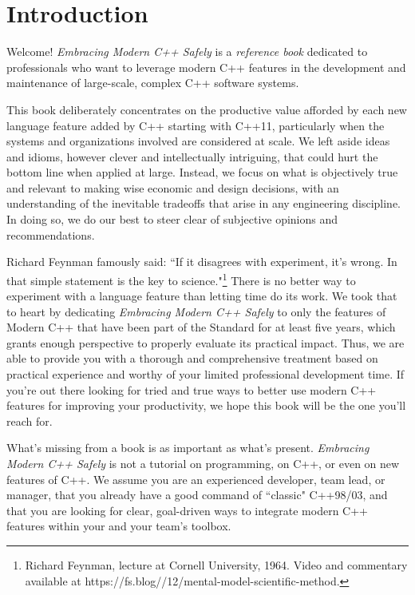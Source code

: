 \setcounter{chapter}{-1}
\chapter[Introduction]{Introduction}\label{ch-intro}

Welcome! \textit{Embracing Modern C++ Safely} is a \textit{reference book} dedicated to professionals who want to leverage modern C++ features in the development and maintenance of large-scale, complex C++ software systems.

This book deliberately concentrates on the productive value afforded by each new language feature added by C++ starting with C++11, particularly when the systems and organizations involved are considered at scale. We left aside ideas and idioms, however clever and intellectually intriguing, that could hurt the bottom line when applied at large. Instead, we focus on what is objectively true and relevant to making wise economic and design decisions, with an understanding of the inevitable tradeoffs that arise in any engineering discipline. In doing so, we do our best to steer clear of subjective opinions and recommendations.

Richard Feynman famously said: ``If it disagrees with experiment, it’s wrong. In that simple statement is the key to science."\footnote{Richard Feynman, lecture at Cornell University, 1964. Video and commentary available at https://\linebreak[3]fs.\linebreak[3]blog//12/mental-model-scientific-method.} There is no better way to experiment with a language feature than letting time do its work. We took that to heart by dedicating \textit{Embracing Modern C++ Safely} to only the features of Modern C++ that have been part of the Standard for at least five years, which grants enough perspective to properly evaluate its practical impact. Thus, we are able to provide you with a thorough and comprehensive treatment based on practical experience and worthy of your limited professional development time. If you're out there looking for tried and true ways to better use modern C++ features for improving your productivity, we hope this book will be the one you'll reach for.

What's missing from a book is as important as what's present. \textit{Embracing Modern C++ Safely} is not a tutorial on programming, on C++, or even on new features of C++. We assume you are an experienced developer, team lead, or manager, that you already have a good command of ``classic" C++98/03, and that you are looking for clear, goal-driven ways to integrate modern C++ features within your and your team's toolbox.


